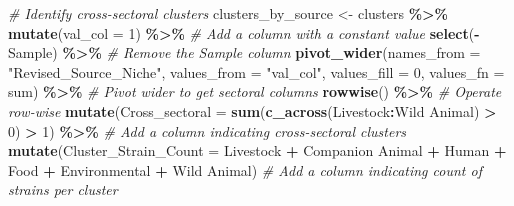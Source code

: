 \documentclass[
]{article}
\newenvironment{Shaded}{\begin{snugshade}}{\end{snugshade}}
\newcommand{\AttributeTok}[1]{\textcolor[rgb]{0.13,0.29,0.53}{#1}}
\newcommand{\CommentTok}[1]{\textcolor[rgb]{0.56,0.35,0.01}{\textit{#1}}}
\newcommand{\DecValTok}[1]{\textcolor[rgb]{0.00,0.00,0.81}{#1}}
\newcommand{\FunctionTok}[1]{\textcolor[rgb]{0.13,0.29,0.53}{\textbf{#1}}}
\newcommand{\NormalTok}[1]{#1}
\newcommand{\OtherTok}[1]{\textcolor[rgb]{0.56,0.35,0.01}{#1}}
\newcommand{\SpecialCharTok}[1]{\textcolor[rgb]{0.81,0.36,0.00}{\textbf{#1}}}
\newcommand{\StringTok}[1]{\textcolor[rgb]{0.31,0.60,0.02}{#1}}
\begin{document}
\begin{Shaded}
\begin{Highlighting}[]
\CommentTok{\# Identify cross{-}sectoral clusters}
\NormalTok{clusters\_by\_source }\OtherTok{\textless{}{-}}\NormalTok{ clusters }\SpecialCharTok{\%\textgreater{}\%}
  \FunctionTok{mutate}\NormalTok{(}\AttributeTok{val\_col =} \DecValTok{1}\NormalTok{) }\SpecialCharTok{\%\textgreater{}\%}                       \CommentTok{\# Add a column with a constant value}
  \FunctionTok{select}\NormalTok{(}\SpecialCharTok{{-}}\NormalTok{Sample) }\SpecialCharTok{\%\textgreater{}\%}                           \CommentTok{\# Remove the Sample column}
  \FunctionTok{pivot\_wider}\NormalTok{(}\AttributeTok{names\_from =} \StringTok{"Revised\_Source\_Niche"}\NormalTok{, }\AttributeTok{values\_from =} \StringTok{"val\_col"}\NormalTok{, }\AttributeTok{values\_fill =} \DecValTok{0}\NormalTok{, }\AttributeTok{values\_fn =}\NormalTok{ sum) }\SpecialCharTok{\%\textgreater{}\%} \CommentTok{\# Pivot wider to get sectoral columns}
  \FunctionTok{rowwise}\NormalTok{() }\SpecialCharTok{\%\textgreater{}\%}                                 \CommentTok{\# Operate row{-}wise}
  \FunctionTok{mutate}\NormalTok{(}\AttributeTok{Cross\_sectoral =} \FunctionTok{sum}\NormalTok{(}\FunctionTok{c\_across}\NormalTok{(Livestock}\SpecialCharTok{:}\StringTok{\textasciigrave{}}\AttributeTok{Wild Animal}\StringTok{\textasciigrave{}}\NormalTok{) }\SpecialCharTok{\textgreater{}} \DecValTok{0}\NormalTok{) }\SpecialCharTok{\textgreater{}} \DecValTok{1}\NormalTok{) }\SpecialCharTok{\%\textgreater{}\%} \CommentTok{\# Add a column indicating cross{-}sectoral clusters}
  \FunctionTok{mutate}\NormalTok{(}\AttributeTok{Cluster\_Strain\_Count =}\NormalTok{ Livestock }\SpecialCharTok{+} \StringTok{\textasciigrave{}}\AttributeTok{Companion Animal}\StringTok{\textasciigrave{}} \SpecialCharTok{+}\NormalTok{ Human }\SpecialCharTok{+}\NormalTok{ Food }\SpecialCharTok{+}\NormalTok{ Environmental }\SpecialCharTok{+} \StringTok{\textasciigrave{}}\AttributeTok{Wild Animal}\StringTok{\textasciigrave{}}\NormalTok{) }\CommentTok{\# Add a column indicating count of strains per cluster}


\end{Highlighting}
\end{Shaded}
\end{document}
